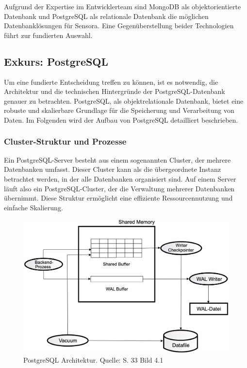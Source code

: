 Aufgrund der Expertise im Entwicklerteam sind MongoDB als objektorientierte Datenbank und PostgreSQL als relationale Datenbank die möglichen Datenbanklösungen für Sensora. Eine Gegenüberstellung beider Technologien führt zur fundierten Auswahl.

\subsection{Exkurs: PostgreSQL}
Um eine fundierte Entscheidung treffen zu können, ist es notwendig, die Architektur und die technischen Hintergründe der PostgreSQL-Datenbank genauer zu betrachten. PostgreSQL, als objektrelationale Datenbank, bietet eine robuste und skalierbare Grundlage für die Speicherung und Verarbeitung von Daten. Im Folgenden wird der Aufbau von PostgreSQL detailliert beschrieben.

\subsubsection{Cluster-Struktur und Prozesse}
Ein PostgreSQL-Server besteht aus einem sogenannten Cluster, der mehrere Datenbanken umfasst. Dieser Cluster kann als die übergeordnete Instanz betrachtet werden, in der alle Datenbanken organisiert sind. Auf einem Server läuft also ein PostgreSQL-Cluster, der die Verwaltung mehrerer Datenbanken übernimmt. Diese Struktur ermöglicht eine effiziente Ressourcennutzung und einfache Skalierung.

\begin{figure}[h]
\centering
\includegraphics[width=\textwidth]{img/PostgreSQL Aufbau.png}
\caption{PostgreSQL Architektur. Quelle: \cite{Fröhlich2022} S. 33 Bild 4.1}
\label{fig:Architektur}
\end{figure}

